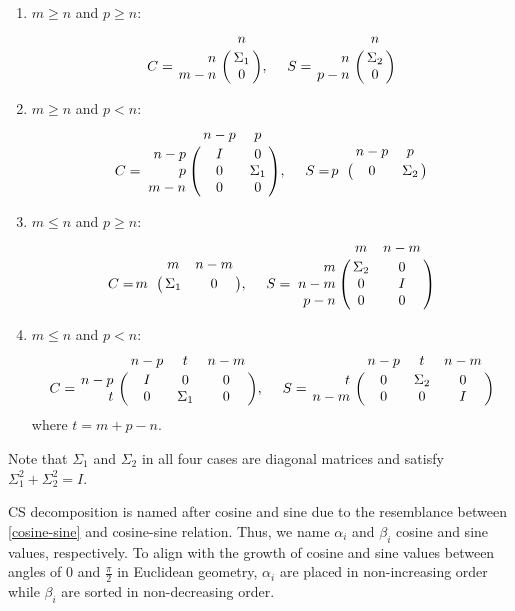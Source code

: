     \begin{enumerate}
        \item $m \geq n$ and $p \geq n$:
        \begin{displaymath}
            C = \bordermatrix{ & n  \cr
            \hfill n & \Sigma_1 \cr
            \hfill m-n & 0}, \  \ \ \
            S = \bordermatrix{ & n \cr
            \hfill n & \Sigma_2 \cr
            \hfill p-n & 0}
        \end{displaymath}
        
        \item $m \geq n$ and $p < n$:
        \begin{displaymath}
            C = \bordermatrix{ & n-p & p  \cr
            \hfill n-p & I & 0 \cr
            \hfill p & 0 & \Sigma_1 \cr
            \hfill m-n & 0 & 0}, \  \ \ \
            S = \bordermatrix{ & n-p & p\cr
            \hfill p & 0 & \Sigma_2}
        \end{displaymath}
        
        \item $m \leq n$ and $p \geq n$:
        \begin{displaymath}
            C = \bordermatrix{ & m & n-m\cr
            \hfill m & \Sigma_1 & 0}, \  \ \ \
            S = \bordermatrix{ & m & n-m  \cr
            \hfill m & \Sigma_2 & 0 \cr
            \hfill n-m & 0 & I \cr
            \hfill p-n & 0 & 0}
        \end{displaymath}
        
        \item $m \leq n$ and $p < n$:
        \begin{displaymath}
            C = \bordermatrix{ & n-p & t & n-m \cr
            \hfill n-p & I & 0 & 0 \cr
            \hfill t & 0 & \Sigma_1 & 0}, \  \ \ \
            S = \bordermatrix{ & n-p & t & n-m \cr
            \hfill t & 0 & \Sigma_2 & 0 \cr
            \hfill n-m & 0 & 0 & I}
        \end{displaymath}
        where $t = m+p-n$.
    \end{enumerate}
    
    Note that $\Sigma_1$ and $\Sigma_2$ in all four cases are diagonal matrices and satisfy $\Sigma_1^2 + \Sigma_2^2 = I$.

    CS decomposition is named after cosine and sine due to the resemblance between \eqref{cosine-sine} and cosine-sine relation. Thus, we name $\alpha_i$ and $\beta_i$ cosine and sine values, respectively. To align with the growth of cosine and sine values between angles of 0 and $\frac{\pi}{2}$ in Euclidean geometry, $\alpha_i$ are placed in non-increasing order while $\beta_i$ are sorted in non-decreasing order. 

